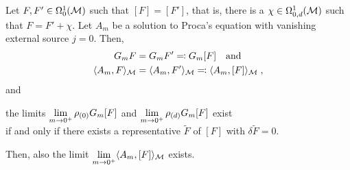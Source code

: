 %
%
\begin{theorem}\label{thm:limit_existence_sourcefree_classical}
	Let $F, F' \in \Omega^1_0(\mathcal{M})$ such that $[F] = [F']$, that is, there is a $\chi \in \Omega^1_{0,d}(\mathcal{M})$ such that $F = F' + \chi$. Let $A_m$ be a solution to Proca's equation with vanishing external source $j=0$. Then,
	\begin{align}
		G_m F &= G_m F' \eqqcolon G_m [F] \quad \text{and} \\
		\langle A_m, F \rangle_{\mathcal{M}} &=\langle A_m, F' \rangle_{\mathcal{M}} \eqqcolon \langle A_m, [F] \rangle_{\mathcal{M}} \;,
	\end{align}
	and
	\begin{center}
		the limits $\lim\limits_{m \to 0^+} \rho_{(0)} G_m [F]$ and  $\lim\limits_{m \to 0^+} \rho_{(d)} G_m [F]$ exist\\[2mm] 	 if and only if there exists a representative $\tilde{F}$ of $[F]$ with ${\delta \tilde{F}} = 0 $.
	\end{center}
	Then, also the limit $\lim\limits_{m \to 0^+} \langle A_m, [F] \rangle_{\mathcal{M}}$ exists.
\end{theorem}
